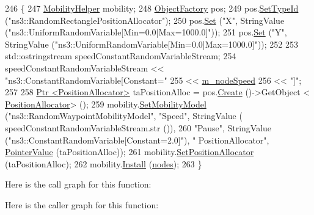 \begin{DoxyCode}
246 \{
247   \hyperlink{classns3_1_1MobilityHelper}{MobilityHelper} mobility;
248   \hyperlink{classns3_1_1ObjectFactory}{ObjectFactory} pos;
249   pos.\hyperlink{classns3_1_1ObjectFactory_a77dcd099064038a1eb7a6b8251229ec3}{SetTypeId} (\textcolor{stringliteral}{"ns3::RandomRectanglePositionAllocator"});
250   pos.\hyperlink{classns3_1_1ObjectFactory_aef5c0d5019c96bdf01cefd1ff83f4a68}{Set} (\textcolor{stringliteral}{"X"}, StringValue (\textcolor{stringliteral}{"ns3::UniformRandomVariable[Min=0.0|Max=1000.0]"}));
251   pos.\hyperlink{classns3_1_1ObjectFactory_aef5c0d5019c96bdf01cefd1ff83f4a68}{Set} (\textcolor{stringliteral}{"Y"}, StringValue (\textcolor{stringliteral}{"ns3::UniformRandomVariable[Min=0.0|Max=1000.0]"}));
252 
253   std::ostringstream speedConstantRandomVariableStream;
254   speedConstantRandomVariableStream << \textcolor{stringliteral}{"ns3::ConstantRandomVariable[Constant="}
255                                    << \hyperlink{classDsdvManetExample_a8f977ed90cf0bbef3b4d95cfe08a6056}{m\_nodeSpeed}
256                                    << \textcolor{stringliteral}{"]"};
257 
258   \hyperlink{classns3_1_1Ptr}{Ptr <PositionAllocator>} taPositionAlloc = pos.\hyperlink{classns3_1_1ObjectFactory_a18152e93f0a6fe184ed7300cb31e9896}{Create} ()->GetObject <
      \hyperlink{classns3_1_1PositionAllocator}{PositionAllocator}> ();
259  mobility.\hyperlink{classns3_1_1MobilityHelper_a030275011b6f40682e70534d30280aba}{SetMobilityModel} (\textcolor{stringliteral}{"ns3::RandomWaypointMobilityModel"}, \textcolor{stringliteral}{"Speed"}, StringValue (
      speedConstantRandomVariableStream.str ()),
260                              \textcolor{stringliteral}{"Pause"}, StringValue (\textcolor{stringliteral}{"ns3::ConstantRandomVariable[Constant=2.0]"}), \textcolor{stringliteral}{"
      PositionAllocator"}, \hyperlink{classns3_1_1PointerValue}{PointerValue} (taPositionAlloc));
261   mobility.\hyperlink{classns3_1_1MobilityHelper_ac59d5295076be3cc11021566713a28c5}{SetPositionAllocator} (taPositionAlloc);
262   mobility.\hyperlink{classns3_1_1MobilityHelper_a07737960ee95c0777109cf2994dd97ae}{Install} (\hyperlink{classDsdvManetExample_a0d8c36ee21821999cc05443bb7efbb8f}{nodes});
263 \}
\end{DoxyCode}


Here is the call graph for this function\+:




Here is the caller graph for this function\+:


